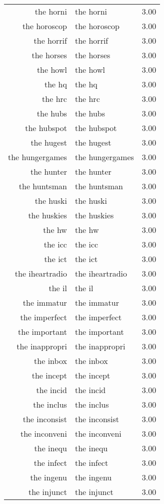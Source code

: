 \begin{table}[ht]
\begin{tabular}{rlr}
  the horni & the horni & 3.00 \\ 
  the horoscop & the horoscop & 3.00 \\ 
  the horrif & the horrif & 3.00 \\ 
  the horses & the horses & 3.00 \\ 
  the howl & the howl & 3.00 \\ 
  the hq & the hq & 3.00 \\ 
  the hrc & the hrc & 3.00 \\ 
  the hubs & the hubs & 3.00 \\ 
  the hubspot & the hubspot & 3.00 \\ 
  the hugest & the hugest & 3.00 \\ 
  the hungergames & the hungergames & 3.00 \\ 
  the hunter & the hunter & 3.00 \\ 
  the huntsman & the huntsman & 3.00 \\ 
  the huski & the huski & 3.00 \\ 
  the huskies & the huskies & 3.00 \\ 
  the hw & the hw & 3.00 \\ 
  the icc & the icc & 3.00 \\ 
  the ict & the ict & 3.00 \\ 
  the iheartradio & the iheartradio & 3.00 \\ 
  the il & the il & 3.00 \\ 
  the immatur & the immatur & 3.00 \\ 
  the imperfect & the imperfect & 3.00 \\ 
  the important & the important & 3.00 \\ 
  the inappropri & the inappropri & 3.00 \\ 
  the inbox & the inbox & 3.00 \\ 
  the incept & the incept & 3.00 \\ 
  the incid & the incid & 3.00 \\ 
  the inclus & the inclus & 3.00 \\ 
  the inconsist & the inconsist & 3.00 \\ 
  the inconveni & the inconveni & 3.00 \\ 
  the inequ & the inequ & 3.00 \\ 
  the infect & the infect & 3.00 \\ 
  the ingenu & the ingenu & 3.00 \\ 
  the injunct & the injunct & 3.00 \\ 

\end{tabular}
\end{table}
